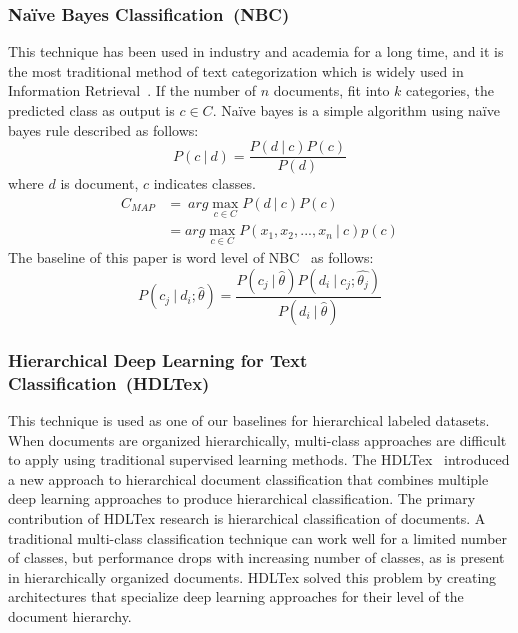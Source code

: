 \documentclass[sigconf, final]{acmart}
\newcommand\given[1][]{\:#1\vert\:}
\begin{document}
\subsubsection{Na\"{i}ve Bayes Classification~(NBC)}\label{me_NB}
This technique has been used in industry and academia for a long time, and it is the most traditional method of text categorization which is widely used in Information Retrieval~\cite{manning2008introduction}. If the number of $n$ documents, fit into $k$ categories, the predicted class as output is $c \in C$. Na\"{i}ve bayes is a simple algorithm using na\"{i}ve bayes rule described  as follows:
\begin{equation}
P(c \given d) = \frac{P(d \given c)P(c)}{P(d)}
\end{equation}
where $d$ is document, $c$ indicates classes.
\begin{equation} \label{eq1}
\begin{split}
C_{MAP} &=~  arg \max_{c \in C} P(d \given c)P(c) \\&= arg \max_{c\in C} P(x_1,x_2,...,x_n \given c) p(c)
\end{split}
\end{equation}
The baseline of this paper is word level of NBC~\cite{kim2006some} as follows:
\begin{equation}
    P(c_j \given d_i;\hat{\theta}) = \frac{P(c_j \given \hat{\theta})P(d_i \given c_j ; \hat{\theta_j})}{P(d_i \given \hat{\theta})}
\end{equation}

\subsubsection{Hierarchical Deep Learning for Text Classification~(HDLTex)} This technique is used as one of our baselines for hierarchical labeled datasets. When documents are organized hierarchically, multi-class approaches are difficult to apply using traditional supervised learning methods. The HDLTex~\cite{kowsari2017HDLTex} introduced a new approach to hierarchical document classification that combines multiple deep learning approaches to produce hierarchical classification. The primary contribution of HDLTex research is hierarchical classification of documents.  A traditional multi-class classification technique can work well for a limited number of classes, but performance drops with increasing number of classes, as is present in hierarchically organized documents. HDLTex solved this problem by creating architectures that specialize deep learning approaches for their level of the document hierarchy.
\end{document}
